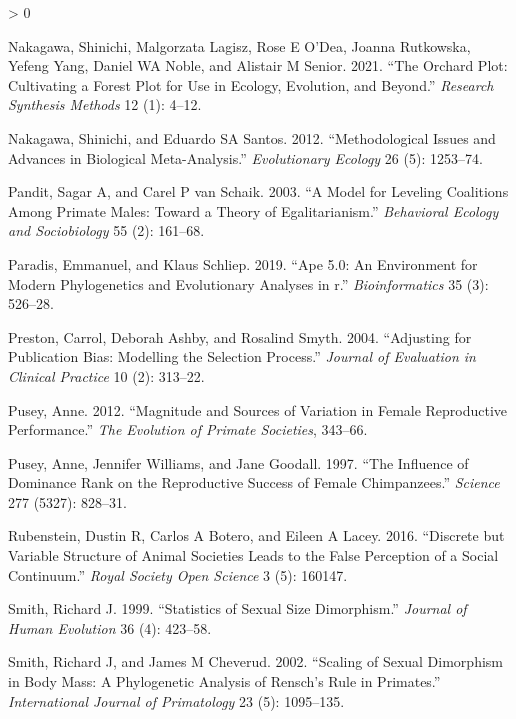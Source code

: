 \documentclass[
]{article}
\newlength{\cslhangindent}
\newenvironment{CSLReferences}[2] %
 {%
  \setlength{\parindent}{0pt}
  \ifodd #1 \everypar{\setlength{\hangindent}{\cslhangindent}}\ignorespaces\fi
  \ifnum #2 > 0
  \setlength{\parskip}{#2\baselineskip}
  \fi
 }%
 {}
\begin{document}
\begin{CSLReferences}{1}{0}
\leavevmode\hypertarget{ref-nakagawa2021orchard}{}%
Nakagawa, Shinichi, Malgorzata Lagisz, Rose E O'Dea, Joanna Rutkowska,
Yefeng Yang, Daniel WA Noble, and Alistair M Senior. 2021. {``The
Orchard Plot: Cultivating a Forest Plot for Use in Ecology, Evolution,
and Beyond.''} \emph{Research Synthesis Methods} 12 (1): 4--12.

\leavevmode\hypertarget{ref-nakagawa2012methodological}{}%
Nakagawa, Shinichi, and Eduardo SA Santos. 2012. {``Methodological
Issues and Advances in Biological Meta-Analysis.''} \emph{Evolutionary
Ecology} 26 (5): 1253--74.

\leavevmode\hypertarget{ref-pandit2003model}{}%
Pandit, Sagar A, and Carel P van Schaik. 2003. {``A Model for Leveling
Coalitions Among Primate Males: Toward a Theory of Egalitarianism.''}
\emph{Behavioral Ecology and Sociobiology} 55 (2): 161--68.

\leavevmode\hypertarget{ref-paradis2019ape}{}%
Paradis, Emmanuel, and Klaus Schliep. 2019. {``Ape 5.0: An Environment
for Modern Phylogenetics and Evolutionary Analyses in r.''}
\emph{Bioinformatics} 35 (3): 526--28.

\leavevmode\hypertarget{ref-preston2004adjusting}{}%
Preston, Carrol, Deborah Ashby, and Rosalind Smyth. 2004. {``Adjusting
for Publication Bias: Modelling the Selection Process.''} \emph{Journal
of Evaluation in Clinical Practice} 10 (2): 313--22.

\leavevmode\hypertarget{ref-pusey2012magnitude}{}%
Pusey, Anne. 2012. {``Magnitude and Sources of Variation in Female
Reproductive Performance.''} \emph{The Evolution of Primate Societies},
343--66.

\leavevmode\hypertarget{ref-pusey1997influence}{}%
Pusey, Anne, Jennifer Williams, and Jane Goodall. 1997. {``The Influence
of Dominance Rank on the Reproductive Success of Female Chimpanzees.''}
\emph{Science} 277 (5327): 828--31.

\leavevmode\hypertarget{ref-rubenstein2016discrete}{}%
Rubenstein, Dustin R, Carlos A Botero, and Eileen A Lacey. 2016.
{``Discrete but Variable Structure of Animal Societies Leads to the
False Perception of a Social Continuum.''} \emph{Royal Society Open
Science} 3 (5): 160147.

\leavevmode\hypertarget{ref-smith1999statistics}{}%
Smith, Richard J. 1999. {``Statistics of Sexual Size Dimorphism.''}
\emph{Journal of Human Evolution} 36 (4): 423--58.

\leavevmode\hypertarget{ref-smith2002scaling}{}%
Smith, Richard J, and James M Cheverud. 2002. {``Scaling of Sexual
Dimorphism in Body Mass: A Phylogenetic Analysis of Rensch's Rule in
Primates.''} \emph{International Journal of Primatology} 23 (5):
1095--135.


\end{CSLReferences}
\end{document}
